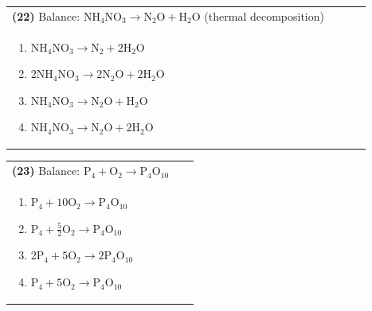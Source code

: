 \documentclass{article}
\begin{document}
{\vspace{0.2cm}
\noindent \begin{tabular}{|p{0.9\linewidth}|}
\hline
\vspace{0.2cm}
\textbf{(22)} Balance: \(\mathrm{NH_4NO_3 \rightarrow N_2O + H_2O}\) (thermal decomposition)\\
\begin{minipage}[t]{0.85\linewidth}
\begin{enumerate}[label=\alph*.]
   \item \(\mathrm{NH_4NO_3 \rightarrow N_2 + 2H_2O}\)
   \item \(\mathrm{2NH_4NO_3 \rightarrow 2N_2O + 2H_2O}\)
   \item \(\mathrm{NH_4NO_3 \rightarrow N_2O + H_2O}\)
   \item \(\mathrm{NH_4NO_3 \rightarrow N_2O + 2H_2O}\)
\end{enumerate}
\end{minipage}\\
\hline
\end{tabular}

\vspace{0.2cm}
\noindent \begin{tabular}{|p{0.9\linewidth}|}
\hline
\vspace{0.2cm}
\textbf{(23)} Balance: \(\mathrm{P_4 + O_2 \rightarrow P_4O_{10}}\)\\
\begin{minipage}[t]{0.85\linewidth}
\begin{enumerate}[label=\alph*.]
   \item \(\mathrm{P_4 + 10O_2 \rightarrow P_4O_{10}}\)
   \item \(\mathrm{P_4 + \tfrac{5}{2}O_2 \rightarrow P_4O_{10}}\)
   \item \(\mathrm{2P_4 + 5O_2 \rightarrow 2P_4O_{10}}\)
   \item \(\mathrm{P_4 + 5O_2 \rightarrow P_4O_{10}}\)
\end{enumerate}
\end{minipage}\\
\hline
\end{tabular}

}
\end{document}
